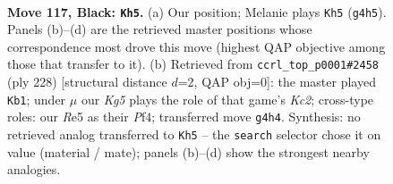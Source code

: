 \documentclass[11pt]{article}
\begin{document}
\begin{figure}[p]\centering
\begin{subfigure}{0.46\textwidth}\centering
\resizebox{\linewidth}{!}{%
\newchessgame
\chessboard[
  setfen={6K1/8/8/4r3/6k1/8/8/8 b - - 19 117},
  showmover=false,
  pgfstyle=straightmove, color=movearrow, markmove={g4-h5}
]}
\caption{}
\end{subfigure}\hfill
\begin{subfigure}{0.46\textwidth}\centering
\resizebox{\linewidth}{!}{%
\newchessgame
\chessboard[
  setfen={8/8/8/2k5/5P2/8/2K5/8 w - - 0 115},
  showmover=false,
  pgfstyle=straightmove, color=movearrow, markmove={c2-b1}
]}
\caption{}
\end{subfigure}
\\[4pt]

\caption{\textbf{Move 117, Black: \texttt{Kh5}.} (a) Our position; Melanie plays \texttt{Kh5} (\texttt{g4h5}). Panels (b)--(d) are the retrieved master positions whose correspondence most drove this move (highest QAP objective among those that transfer to it). (b) Retrieved from \texttt{ccrl\_top\_p0001\#2458} (ply 228) [structural distance $d$=2, QAP obj=0]: the master played \texttt{Kb1}; under $\mu$ our \emph{Kg5} plays the role of that game's \emph{Kc2}; cross-type roles: our \emph{R}e5 as their \emph{P}f4; transferred move \texttt{g4h4}. Synthesis: no retrieved analog transferred to \texttt{Kh5} -- the \texttt{search} selector chose it on value (material / mate); panels (b)--(d) show the strongest nearby analogies.}
\label{fig:thought-m233}
\end{figure}

\clearpage
\end{document}
